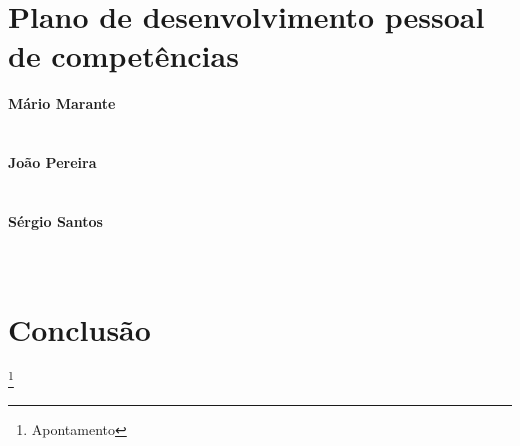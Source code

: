 \section{Plano de desenvolvimento pessoal de competências}
\textbf{Mário Marante}\\
\\ \\
\textbf{João Pereira}\\
\\ \\
\textbf{Sérgio Santos}\\
\\ \\

\newpage
\section{Conclusão}
\newpage
%
%
\listoffigures
\cite{*}

\newpage
\footnote{Apontamento}

